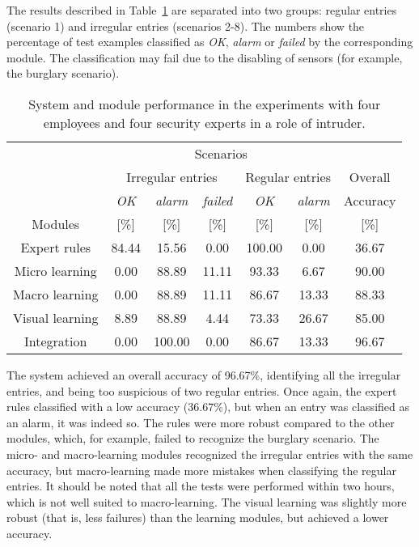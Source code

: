 The results described in Table~\ref{tab:results} are separated into two groups: regular entries (scenario 1) and irregular entries (scenarios 2-8). The numbers show the percentage of test examples classified as \textit{OK}, \textit{alarm} or \textit{failed} by the corresponding module. The classification may fail due to the disabling of sensors (for example, the burglary scenario).


\begin{table}[!ht]
\centering

\begin{tabular}{ccccccc}
\toprule
           &                                \multicolumn{ 5}{c}{Scenarios} &            \\
		   & \multicolumn{ 3}{c}{Irregular entries} & \multicolumn{ 2}{c}{Regular entries} &   Overall  \\
           &   {\it OK} & {\it alarm} & {\it failed} &   {\it OK} & {\it alarm} &   Accuracy \\
Modules    &   [\%] 	& [\%] & [\%] &   [\%] & [\%] &  [\%] \\
\hline
Expert rules &    84.44 &    15.56 &     0.00 &   100.00 &     0.00 &    36.67 \\

Micro learning &     0.00 &    88.89 &    11.11 &    93.33 &     6.67 &    90.00 \\

Macro learning &     0.00 &    88.89 &    11.11 &    86.67 &    13.33 &    88.33 \\

Visual learning &     8.89 &    88.89 &     4.44 &    73.33 &    26.67 &    85.00 \\

Integration &     0.00 &   100.00 &     0.00 &    86.67 &    13.33 &    96.67 \\
\toprule
\end{tabular}  


\caption{System and module performance in the experiments with four employees and four  security experts in a role of intruder.}
\label{tab:results}
\end{table}

The system achieved an overall accuracy of 96.67\%, identifying all the irregular entries, and being too suspicious of two regular entries. Once again, the expert rules classified with a low accuracy (36.67\%), but when an entry was classified as an alarm, it was indeed so. The rules were more robust compared to the other modules, which, for example, failed to recognize the burglary scenario. The micro- and macro-learning modules recognized the irregular entries with the same accuracy, but macro-learning made more mistakes when classifying the regular entries. It should be noted that all the tests were performed within two hours, which is not well suited to macro-learning. The visual learning was slightly more robust (that is, less failures) than the learning modules, but achieved a lower accuracy. 





